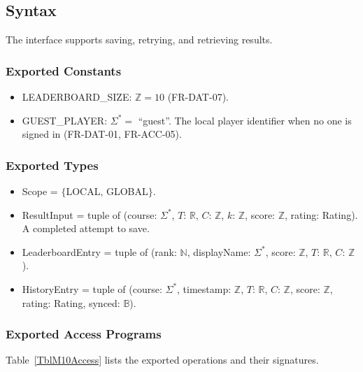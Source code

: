 \documentclass[12pt, titlepage]{article}
\begin{document}
\subsection{Syntax}

The interface supports saving, retrying, and retrieving results.

\subsubsection{Exported Constants}

\begin{itemize}
\item LEADERBOARD\_SIZE: $\mathbb{Z} = 10$ (FR-DAT-07).
\item GUEST\_PLAYER: $\Sigma^* =$ ``guest''. The local player identifier when
  no one is signed in (FR-DAT-01, FR-ACC-05).
\end{itemize}

\subsubsection{Exported Types}

\begin{itemize}
\item Scope = $\{$LOCAL, GLOBAL$\}$.
\item ResultInput = tuple of (course: $\Sigma^*$, $T$: $\mathbb{R}$, $C$:
  $\mathbb{Z}$, $k$: $\mathbb{Z}$, score: $\mathbb{Z}$, rating: Rating). A
  completed attempt to save.
\item LeaderboardEntry = tuple of (rank: $\mathbb{N}$, displayName:
  $\Sigma^*$, score: $\mathbb{Z}$, $T$: $\mathbb{R}$, $C$: $\mathbb{Z}$).
\item HistoryEntry = tuple of (course: $\Sigma^*$, timestamp: $\mathbb{Z}$,
  $T$: $\mathbb{R}$, $C$: $\mathbb{Z}$, score: $\mathbb{Z}$, rating: Rating,
  synced: $\mathbb{B}$).
\end{itemize}

\subsubsection{Exported Access Programs}

Table~\ref{TblM10Access} lists the exported operations and their signatures.
\end{document}
